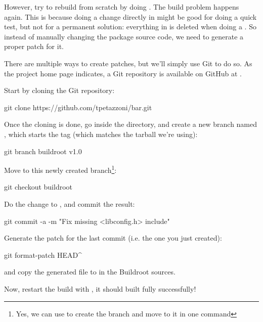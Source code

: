 However, try to rebuild  from scratch by doing . The build problem happens again. This is because
doing a change directly in  might be good for
doing a quick test, but not for a permanent solution: everything in
 is deleted when doing a . So instead of
manually changing the package source code, we need to generate a
proper patch for it.

There are multiple ways to create patches, but we'll simply use Git to
do so. As the  project home page indicates, a Git repository
is available on GitHub at .

Start by cloning the Git repository:

\begin{bashinput}
git clone https://github.com/tpetazzoni/bar.git
\end{bashinput}

Once the cloning is done, go inside the  directory, and
create a new branch named , which starts the
 tag (which matches the  tarball we're
using):

\begin{bashinput}
git branch buildroot v1.0
\end{bashinput}

Move to this newly created branch\footnote{Yes, we can use  to create the branch and move to it in one command}:

\begin{bashinput}
git checkout buildroot
\end{bashinput}

Do the  change to , and
commit the result:

\begin{bashinput}
git commit -a -m "Fix missing <libconfig.h> include"
\end{bashinput}

Generate the patch for the last commit (i.e. the one you just created):

\begin{bashinput}
git format-patch HEAD^
\end{bashinput}

and copy the generated  file to 
in the Buildroot sources.

Now, restart the build with , it should
built fully successfully!

